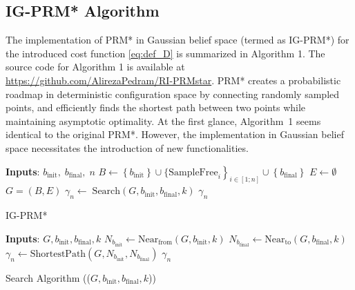 \documentclass[Afour,sageh,times]{sagej}
\begin{document}
\subsection{IG-PRM* Algorithm}
The implementation of PRM* in Gaussian belief space (termed as IG-PRM*)
for the introduced cost function \eqref{eq:def_D} is summarized in Algorithm 1. The source code for Algorithm 1 is available at \href{https://github.com/AlirezaPedram/RI-PRMstar}{ https://github.com/AlirezaPedram/RI-PRMstar}. PRM* \cite{karaman2010incremental} creates a probabilistic roadmap in deterministic configuration space by connecting randomly sampled points, and efficiently finds the shortest path between two points while maintaining asymptotic optimality.
At the first glance, Algorithm~1 seems identical to the original PRM*. However, the implementation in Gaussian belief space necessitates the introduction of new functionalities. 


\begin{algorithm}
    { 
        \textbf{Inputs}: $ b_{\text{init}}, \;b_{\text{final}},\;n$ \;
    $\left.B \leftarrow\left\{b_{\text{init}}\right\} \cup\{\text {SampleFree}_{i}\right\}_{i\in [1;n]}\cup\left\{b_{\text{final}}\right\} $\;
    $E \leftarrow \emptyset$\;
    $G=(B, E)$\;
    $\gamma_n\leftarrow \;\text{Search}(G, b_{\text{init}}, b_{\text{final}}, k)$\;
    \Return $\gamma_n$
    }
\caption{IG-PRM*}
\label{alg:igpp_body1}
\end{algorithm}
\begin{algorithm}
    {
    \textbf{Inputs}: $G, b_{\text{init}}, b_{\text{final}}, k$ \;
    $N_{b_{\text{init}}} \leftarrow \text{Near}_{\text{from}}(G, b_\text{init},k) $\;
    $N_{b_{\text{final}}} \leftarrow \text{Near}_{\text{to}}(G, b_\text{final},k)$\;
    $\gamma_n\leftarrow \text{ShortestPath}(G, N_{b_{\text{init}}}, N_{b_{\text{final}}})$\;
    \Return $\gamma_n$
    }
\caption{Search Algorithm (($G, b_{\text{init}}, b_{\text{final}}, k$))}
\label{algo:search}
\end{algorithm}
\end{document}
